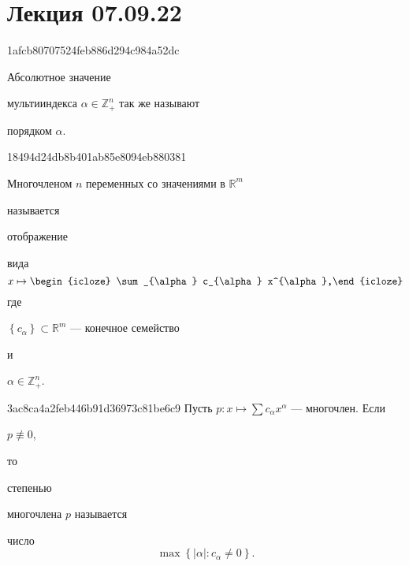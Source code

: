 


\section{Лекция 07.09.22}
\begin{note}{1afcb80707524feb886d294c984a52dc}
    \begin{icloze}{2}Абсолютное значение\end{icloze} мультииндекса \({ \alpha \in \mathbb Z_+^{n} }\) так же называют \begin{icloze}{1}порядком \({ \alpha }\).\end{icloze}
\end{note}

\begin{note}{18494d24db8b401ab85e8094eb880381}
    \begin{icloze}{3}Многочленом \({ n }\) переменных со значениями в \({ \mathbb R^{m} }\)\end{icloze} называется \begin{icloze}{4}отображение\end{icloze} вида
    \[
        x \mapsto \begin{icloze}{1}\sum_{\alpha} c_{\alpha} x^{\alpha},\end{icloze}
    \]
    где \begin{icloze}{2}\({ \left\{ c_{\alpha} \right\} \subset \mathbb R^{m} }\) --- конечное семейство\end{icloze} и \begin{icloze}{5}\({ \alpha \in \mathbb Z_+^{n} }\).\end{icloze}
\end{note}

\begin{note}{3ac8ca4a2feb446b91d36973c81be6c9}
    Пусть \({ p : x \mapsto \sum c_{\alpha}x^{\alpha} }\) --- многочлен.
    Если \begin{icloze}{2}\({ p \not\equiv 0 }\),\end{icloze} то \begin{icloze}{3}степенью\end{icloze} многочлена \({ p }\) называется
    \begin{icloze}{1}
        число
        \[
            \max \left\{ \left\lvert \alpha \right\rvert : c_{\alpha} \neq 0 \right\}.
        \]
    \end{icloze}
\end{note}

